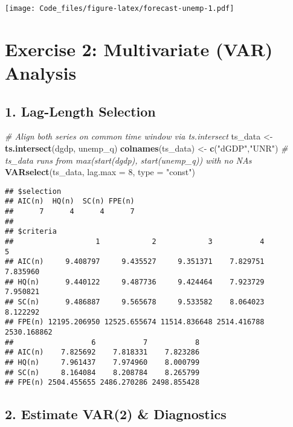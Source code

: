 \documentclass[
]{article}
\newenvironment{Shaded}{\begin{snugshade}}{\end{snugshade}}
\newcommand{\AttributeTok}[1]{\textcolor[rgb]{0.13,0.29,0.53}{#1}}
\newcommand{\CommentTok}[1]{\textcolor[rgb]{0.56,0.35,0.01}{\textit{#1}}}
\newcommand{\DecValTok}[1]{\textcolor[rgb]{0.00,0.00,0.81}{#1}}
\newcommand{\FunctionTok}[1]{\textcolor[rgb]{0.13,0.29,0.53}{\textbf{#1}}}
\newcommand{\NormalTok}[1]{#1}
\newcommand{\OtherTok}[1]{\textcolor[rgb]{0.56,0.35,0.01}{#1}}
\newcommand{\StringTok}[1]{\textcolor[rgb]{0.31,0.60,0.02}{#1}}
\begin{document}
\texttt{[image: Code\_files/figure-latex/forecast-unemp-1.pdf]}

\hypertarget{exercise-2-multivariate-var-analysis}{%
\section{Exercise 2: Multivariate (VAR)
Analysis}\label{exercise-2-multivariate-var-analysis}}

\hypertarget{lag-length-selection}{%
\subsection{1. Lag-Length Selection}\label{lag-length-selection}}

\begin{Shaded}
\begin{Highlighting}[]
\CommentTok{\# Align both series on common time window via ts.intersect}
\NormalTok{ts\_data    }\OtherTok{\textless{}{-}} \FunctionTok{ts.intersect}\NormalTok{(dgdp, unemp\_q)}
\FunctionTok{colnames}\NormalTok{(ts\_data) }\OtherTok{\textless{}{-}} \FunctionTok{c}\NormalTok{(}\StringTok{"dGDP"}\NormalTok{,}\StringTok{"UNR"}\NormalTok{)}
\CommentTok{\# ts\_data runs from max(start(dgdp), start(unemp\_q)) with no NAs}
\FunctionTok{VARselect}\NormalTok{(ts\_data, }\AttributeTok{lag.max =} \DecValTok{8}\NormalTok{, }\AttributeTok{type =} \StringTok{"const"}\NormalTok{)}
\end{Highlighting}
\end{Shaded}

\begin{verbatim}
## $selection
## AIC(n)  HQ(n)  SC(n) FPE(n) 
##      7      4      4      7 
## 
## $criteria
##                   1            2            3           4           5
## AIC(n)     9.408797     9.435527     9.351371    7.829751    7.835960
## HQ(n)      9.440122     9.487736     9.424464    7.923729    7.950821
## SC(n)      9.486887     9.565678     9.533582    8.064023    8.122292
## FPE(n) 12195.206950 12525.655674 11514.836648 2514.416788 2530.168862
##                  6           7           8
## AIC(n)    7.825692    7.818331    7.823286
## HQ(n)     7.961437    7.974960    8.000799
## SC(n)     8.164084    8.208784    8.265799
## FPE(n) 2504.455655 2486.270286 2498.855428
\end{verbatim}

\hypertarget{estimate-var2-diagnostics}{%
\subsection{2. Estimate VAR(2) \&
Diagnostics}\label{estimate-var2-diagnostics}}
\end{document}
